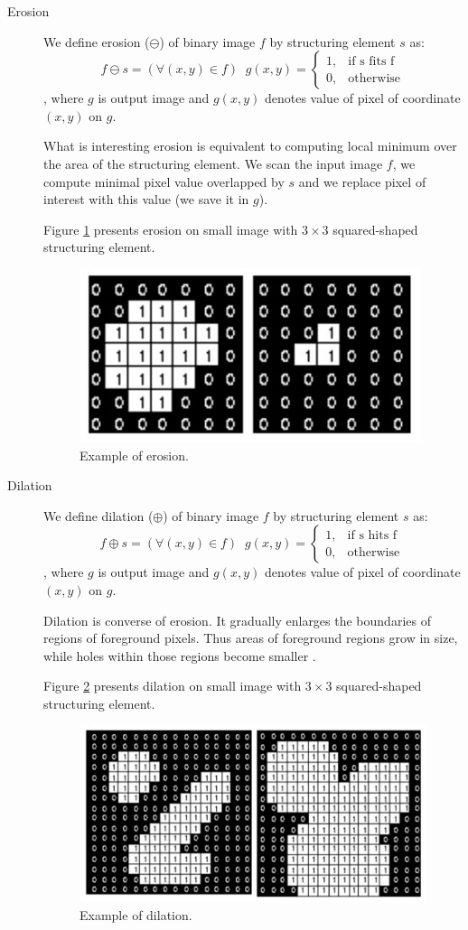 \documentclass{article}
\begin{document}
\begin{description}
%
%
\item[Erosion] We define erosion ($\ominus$) of binary image $f$ by structuring element $s$ as:
\[
    f \ominus s= (\forall{(x,y) \in f})  \;\;
    g(x,y) = 
\begin{cases}
    1,& \text{if s fits f }\\
    0,              & \text{otherwise}
\end{cases} 
\]
, where $g$ is output image and $g(x,y)$ denotes value of pixel of coordinate $(x,y)$ on $g$.

What is interesting erosion is equivalent to computing local minimum over the area of the structuring element. We scan the input image $f$, we compute minimal pixel value overlapped by $s$ and we replace pixel of interest with this value (we save it in $g$)\cite{slajdy_morph}.

Figure \ref{fig:erosion_exampl} presents erosion on small image with $3 \times 3$ squared-shaped structuring element.
\begin{figure}[H]
  \centering
  \includegraphics[width=0.4\linewidth]{_Figures/erosion_example.jpg}
  \caption{Example of erosion.}
  \label{fig:erosion_exampl}
\end{figure}%

%
%
\item[Dilation] We define dilation ($\oplus$) of binary image $f$ by structuring element $s$ as:
\[
    f \oplus s= (\forall{(x,y) \in f})  \;\;
    g(x,y) = 
\begin{cases}
    1,& \text{if s hits f }\\
    0,              & \text{otherwise}
\end{cases} 
\]
, where $g$ is output image and $g(x,y)$ denotes value of pixel of coordinate $(x,y)$ on $g$.

Dilation is converse of erosion. It gradually enlarges the boundaries of regions of foreground pixels. Thus areas of foreground regions grow in size, while holes within those regions become smaller \cite{slajdy_morph}.

Figure \ref{fig:dilation_exampl} presents dilation on small image with $3 \times 3$ squared-shaped structuring element.
\begin{figure}[H]
  \centering
  \includegraphics[width=0.4\linewidth]{_Figures/dilation_example.jpg}
  \caption{Example of dilation.}
  \label{fig:dilation_exampl}
\end{figure}%


\end{description}
\end{document}
